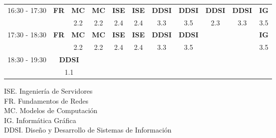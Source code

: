 \documentclass[10pt,spanish, landscape]{article}
\begin{document}
\begin{minipage}{0.7\textwidth}
\begin{tabular}{|c|cc|cc|cc|cc|cc|}
 \hline
\multirow{2}{*}{16:30 - 17:30}  & \textbf{FR} & \textbf{MC} & \textbf{MC} & \textbf{ISE} & \textbf{ISE} & \textbf{DDSI} & \textbf{DDSI} & \textbf{DDSI} & \textbf{DDSI} & \textbf{IG}\\ 
 & {\footnotesize  } & {\footnotesize 2.2} & {\footnotesize 2.2} & {\footnotesize 2.4} & {\footnotesize 2.4} & {\footnotesize 3.3} & {\footnotesize 3.5} & {\footnotesize 2.3} & {\footnotesize 3.3} & {\footnotesize 3.5}\\ 
 \hline
\multirow{2}{*}{17:30 - 18:30}  & \textbf{FR} & \textbf{MC} & \textbf{MC} & \textbf{ISE} & \textbf{ISE} & \textbf{DDSI} & \textbf{DDSI} & \textbf{} & \textbf{} & \textbf{IG}\\ 
 & {\footnotesize  } & {\footnotesize 2.2} & {\footnotesize 2.2} & {\footnotesize 2.4} & {\footnotesize 2.4} & {\footnotesize 3.3} & {\footnotesize 3.5} & {\footnotesize } & {\footnotesize } & {\footnotesize 3.5}\\ 
 \hline
\multirow{2}{*}{18:30 - 19:30} & \multicolumn{2}{|c|}{ \cellcolor{grisclaro} \textbf{DDSI}} &  &  &  &  &  &  &  & \\ 
& \multicolumn{2}{|c|}{ \cellcolor{grisclaro} {\footnotesize 1.1}} &  &  &  &  &  &  &  & \\ 
 \hline

\end{tabular}
\end{minipage}
\begin{minipage}{0.25\textwidth}
ISE. Ingeniería de Servidores\\[0.5cm]
FR. Fundamentos de Redes\\[0.5cm]
MC. Modelos de Computación\\[0.5cm]
IG. Informática Gráfica\\[0.5cm]
DDSI. Diseño y Desarrollo de Sistemas de Información\\[0.5cm]
\end{minipage}
\newpage
\end{document}
